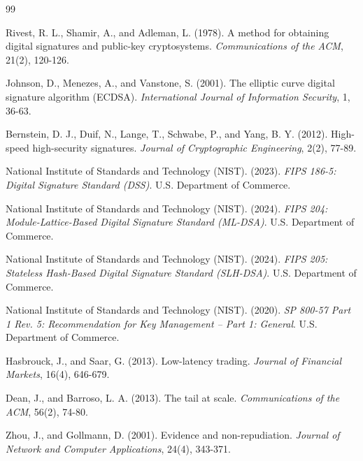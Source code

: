 \documentclass[12pt]{article}
\begin{document}
\begin{thebibliography}{99}

Rivest, R. L., Shamir, A., and Adleman, L. (1978). A method for obtaining digital signatures and public-key cryptosystems. \textit{Communications of the ACM}, 21(2), 120-126.

Johnson, D., Menezes, A., and Vanstone, S. (2001). The elliptic curve digital signature algorithm (ECDSA). \textit{International Journal of Information Security}, 1, 36-63.

Bernstein, D. J., Duif, N., Lange, T., Schwabe, P., and Yang, B. Y. (2012). High-speed high-security signatures. \textit{Journal of Cryptographic Engineering}, 2(2), 77-89.

National Institute of Standards and Technology (NIST). (2023). \textit{FIPS 186-5: Digital Signature Standard (DSS)}. U.S. Department of Commerce.

National Institute of Standards and Technology (NIST). (2024). \textit{FIPS 204: Module-Lattice-Based Digital Signature Standard (ML-DSA)}. U.S. Department of Commerce.

National Institute of Standards and Technology (NIST). (2024). \textit{FIPS 205: Stateless Hash-Based Digital Signature Standard (SLH-DSA)}. U.S. Department of Commerce.

National Institute of Standards and Technology (NIST). (2020). \textit{SP 800-57 Part 1 Rev. 5: Recommendation for Key Management -- Part 1: General}. U.S. Department of Commerce.

Hasbrouck, J., and Saar, G. (2013). Low-latency trading. \textit{Journal of Financial Markets}, 16(4), 646-679.

Dean, J., and Barroso, L. A. (2013). The tail at scale. \textit{Communications of the ACM}, 56(2), 74-80.

Zhou, J., and Gollmann, D. (2001). Evidence and non-repudiation. \textit{Journal of Network and Computer Applications}, 24(4), 343-371.

\end{thebibliography}
\end{document}
